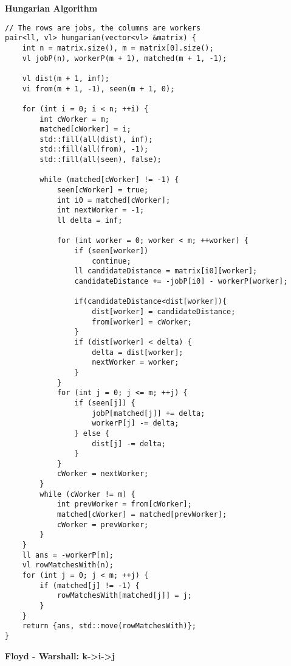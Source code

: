 \documentclass[a4paper,10pt]{article}
\newcommand{\titleAlg}[1]{\vspace{-10pt}
\begin{center}\textbf{#1}\end{center} \vspace{-10pt}}
\begin{document}
\titleAlg{Hungarian Algorithm}
\begin{multicols}{2}
\begin{verbatim}
// The rows are jobs, the columns are workers
pair<ll, vl> hungarian(vector<vl> &matrix) {
    int n = matrix.size(), m = matrix[0].size();
    vl jobP(n), workerP(m + 1), matched(m + 1, -1);

    vl dist(m + 1, inf);
    vi from(m + 1, -1), seen(m + 1, 0);

    for (int i = 0; i < n; ++i) {
        int cWorker = m;
        matched[cWorker] = i;
        std::fill(all(dist), inf);
        std::fill(all(from), -1);
        std::fill(all(seen), false);

        while (matched[cWorker] != -1) {
            seen[cWorker] = true;
            int i0 = matched[cWorker];
            int nextWorker = -1;
            ll delta = inf;

            for (int worker = 0; worker < m; ++worker) {
                if (seen[worker])
                    continue;
                ll candidateDistance = matrix[i0][worker];
                candidateDistance += -jobP[i0] - workerP[worker];

                if(candidateDistance<dist[worker]){
                    dist[worker] = candidateDistance;
                    from[worker] = cWorker;
                }
                if (dist[worker] < delta) {
                    delta = dist[worker];
                    nextWorker = worker;
                }
            }
            for (int j = 0; j <= m; ++j) {
                if (seen[j]) {
                    jobP[matched[j]] += delta;
                    workerP[j] -= delta;
                } else {
                    dist[j] -= delta;
                }
            }
            cWorker = nextWorker;
        }
        while (cWorker != m) {
            int prevWorker = from[cWorker];
            matched[cWorker] = matched[prevWorker];
            cWorker = prevWorker;
        }
    }
    ll ans = -workerP[m];
    vl rowMatchesWith(n);
    for (int j = 0; j < m; ++j) {
        if (matched[j] != -1) {
            rowMatchesWith[matched[j]] = j;
        }
    }
    return {ans, std::move(rowMatchesWith)};
}
\end{verbatim}
\end{multicols}
\titleAlg{Floyd - Warshall: k->i->j}
\end{document}
